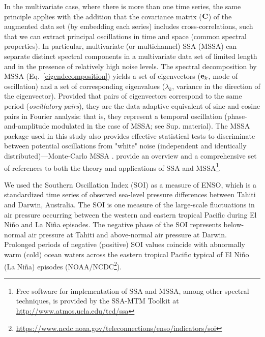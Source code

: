 In the multivariate case, where there is more than one time series, the same principle applies with the addition that the covariance matrix ($\mathbf{C}$) of the augmented data set (by embedding each series) includes cross-correlations, such that we can extract principal oscillations in time and space (common spectral properties). In particular, multivariate (or multichannel) SSA (MSSA) can separate distinct spectral components in a multivariate data set of limited length and in the presence of relatively high noise levels. The spectral decomposition by MSSA (Eq.~\ref{eigendecomposition}) yields a set of eigenvectors ($\mathbf{e}_k$, mode of oscillation) and a set of corresponding eigenvalues ($\lambda_k$, variance in the direction of the eigenvector). Provided that pairs of eigenvectors correspond to the same period ({\it oscillatory pairs}), they are the data-adaptive equivalent of sine-and-cosine pairs in Fourier  analysis: that is, they represent a temporal oscillation (phase-and-amplitude modulated in the case of MSSA; see Sup. material). The MSSA package used in this study also provides effective statistical tests to discriminate between potential oscillations from "white" noise (independent and identically distributed)---Monte-Carlo MSSA \parencite{Allen1996}. \textcite{Ghil2002} provide an overview and a comprehensive set of references to both the theory and applications of SSA and MSSA\footnote{Free software for implementation of SSA and MSSA, among other spectral techniques, is provided by the SSA-MTM Toolkit at \url{http://www.atmos.ucla.edu/tcd/ssa}}.

We used the Southern Oscillation Index (SOI) as a measure of ENSO, which is a standardized time series of observed sea-level pressure differences between Tahiti and Darwin, Australia. The SOI is one measure of the large-scale fluctuations in air pressure occurring between the western and eastern tropical Pacific during El Ni\~no and La Ni\~na episodes. The negative phase of the SOI represents below-normal air pressure at Tahiti and above-normal air pressure at Darwin. Prolonged periods of negative (positive) SOI values coincide with abnormally warm (cold) ocean waters across the eastern tropical Pacific typical of El Ni\~no (La Ni\~na) episodes (NOAA/NCDC\footnote{\url{https://www.ncdc.noaa.gov/teleconnections/enso/indicators/soi}}).

